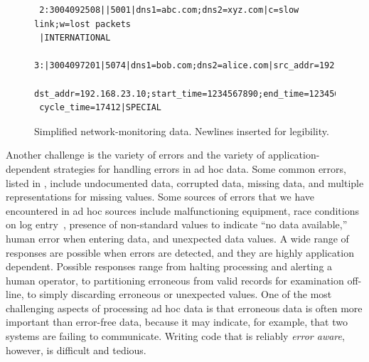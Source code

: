 \begin{figure}
  \centering
  \small
\begin{verbatim}
 2:3004092508||5001|dns1=abc.com;dns2=xyz.com|c=slow link;w=lost packets
 |INTERNATIONAL
 3:|3004097201|5074|dns1=bob.com;dns2=alice.com|src_addr=192.168.0.10;
 dst_addr=192.168.23.10;start_time=1234567890;end_time=1234568000;
 cycle_time=17412|SPECIAL
\end{verbatim}  
  \caption{Simplified network-monitoring data. Newlines 
inserted for legibility.}
  \label{fig:darkstar-records1}
\end{figure}



Another challenge is the variety of errors and the
variety of application-dependent strategies for handling errors in ad
hoc data.  Some common errors, listed in ,
include undocumented data, corrupted data, missing data, and multiple
representations for missing values.  Some sources of errors
that we have encountered in ad hoc sources include malfunctioning
equipment, race conditions on log entry~\cite{wpp}, presence of
non-standard values to indicate ``no data available,'' human error
when entering data, and unexpected data values.  A wide range of
responses are possible when errors are detected, and they are highly
application dependent.  Possible responses range from halting processing
and alerting a human operator, to partitioning erroneous from valid
records for examination off-line, to simply discarding erroneous or
unexpected values.  One of the most challenging aspects of processing
ad hoc data is that erroneous data is often more important than
error-free data, because it may indicate, for example, that two
systems are failing to communicate.  Writing code that is reliably
\emph{error aware}, however, is difficult and tedious.


